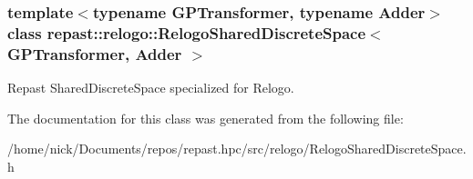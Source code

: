 \subsubsection*{template$<$typename G\-P\-Transformer, typename Adder$>$class repast\-::relogo\-::\-Relogo\-Shared\-Discrete\-Space$<$ G\-P\-Transformer, Adder $>$}

Repast Shared\-Discrete\-Space specialized for Relogo. 

The documentation for this class was generated from the following file\-:\begin{DoxyCompactItemize}
\item 
/home/nick/\-Documents/repos/repast.\-hpc/src/relogo/Relogo\-Shared\-Discrete\-Space.\-h\end{DoxyCompactItemize}
